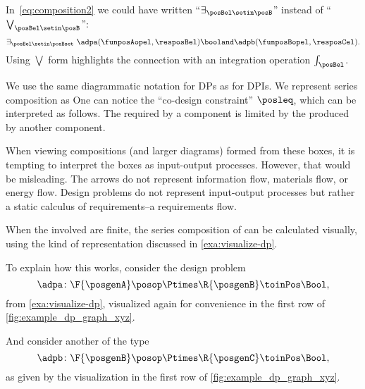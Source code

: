 In~\cref{eq:composition2} we could have written ``$\exists_{\posBel\setin \posB}$'' instead of ``$\bigvee_{\posBel\setin \posB}$'':
\begin{equation}
    \exists_{\posBel \setin \posBset}\ \adpa(\funposAopel,\resposBel) \booland \adpb(\funposBopel,\resposCel).
\end{equation}
Using $\bigvee$ form highlights the connection with an integration operation $\int_\posBel$.

We use the same diagrammatic notation for DPs as for DPIs.
We represent series composition as
%
%
One can notice the ``co-design constraint'' $\posleq$, which can be interpreted as follows.
The  required by a component is limited by the  produced by another component.

When viewing compositions (and larger diagrams) formed from these boxes, it is tempting to interpret the boxes as input-output processes.
However, that would be misleading.
The arrows do not represent information flow, materials flow, or energy flow.
Design problems do not represent input-output processes but rather a static calculus of requirements--a requirements flow.

When the  involved are finite, the series composition of  can be calculated visually, using the kind of representation discussed in \cref{exa:visualize-dp}.

To explain how this works, consider the design problem
\begin{equation}
    \adpa \colon \F{\posgenA} \posop \Ptimes \R{\posgenB} \toinPos \Bool,
\end{equation}
from \cref{exa:visualize-dp}, visualized again for convenience in the first row of \cref{fig:example_dp_graph_xyz}.

And consider another  of the type
\begin{equation}
    \adpb \colon \F{\posgenB} \posop \Ptimes \R{\posgenC} \toinPos \Bool,
\end{equation}
as given by the visualization in the first row of \cref{fig:example_dp_graph_xyz}.

